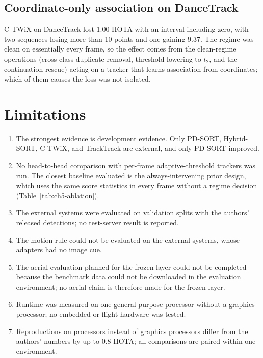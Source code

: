 \subsection{Coordinate-only association on DanceTrack}
C-TWiX on DanceTrack lost 1.00 HOTA with an interval including zero, with two sequences losing more than 10 points and one gaining 9.37. The regime was clean on essentially every frame, so the effect comes from the clean-regime operations (cross-class duplicate removal, threshold lowering to $t_2$, and the continuation rescue) acting on a tracker that learns association from coordinates; which of them causes the loss was not isolated.

\section{Limitations}\label{sec:ch5-limits}
\begin{enumerate}
\item The strongest evidence is development evidence. Only PD-SORT, Hybrid-SORT, C-TWiX, and TrackTrack are external, and only PD-SORT improved.
\item No head-to-head comparison with per-frame adaptive-threshold trackers \cite{ma2023adaptivebytetrack,shim2024adaptrack,act2026adaptive} was run. The closest baseline evaluated is the always-intervening prior design, which uses the same score statistics in every frame without a regime decision (Table~\ref{tab:ch5-ablation}).
\item The external systems were evaluated on validation splits with the authors' released detections; no test-server result is reported.
\item The motion rule could not be evaluated on the external systems, whose adapters had no image cue.
\item The aerial evaluation planned for the frozen layer could not be completed because the benchmark data could not be downloaded in the evaluation environment; no aerial claim is therefore made for the frozen layer.
\item Runtime was measured on one general-purpose processor without a graphics processor; no embedded or flight hardware was tested.
\item Reproductions on processors instead of graphics processors differ from the authors' numbers by up to 0.8 HOTA; all comparisons are paired within one environment.
\end{enumerate}


